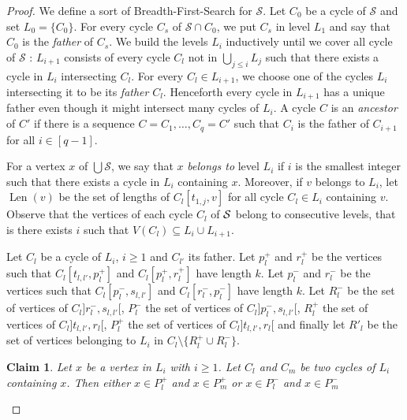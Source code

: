 \documentclass[utf8,10pt]{article}
\theoremstyle{plain}
\newtheorem{claim}{Claim}[theorem]
\theoremstyle{definition}
\theoremstyle{remark}
\DeclareMathOperator{\Len}{Len}
\begin{document}
\begin{proof}
We define a sort of Breadth-First-Search for $\mathcal{S}$.
Let $C_0$ be a cycle of $\mathcal{S}$ and set $L_0 = \{C_0\}$. For every cycle $C_s$ of $\mathcal{S}\cap C_0$, we put $C_s$ in level $L_1$ and say that $C_0$ is the \textit{father} of $C_s$. We build  the levels $L_i$ inductively
until we cover all cycle of $\mathcal{S}$ : $L_{i+1}$ consists of every cycle $C_l$ not in $\bigcup_{j \leq i} L_j$ such that 
there exists a cycle in $L_i$ intersecting $C_l$.  For every $C_l\in L_{i+1}$, we choose one of the cycles $L_{i}$ intersecting it to be its {\it  father}  $C_l$. Henceforth every cycle in $L_{i+1}$ has a unique  father even though it might intersect many cycles of $L_i$.
A cycle $C$ is an {\it ancestor} of $C'$ if there is a sequence $C=C_1, \dots , C_q=C'$ such that $C_i$ is the father of $C_{i+1}$ for all $i\in [q-1]$.

For a vertex $x$ of $\bigcup \mathcal{S}$, we say that $x$ \textit{belongs to} level $L_i$ if
$i$ is the smallest integer such that there exists a cycle in $L_i$ containing $x$. Moreover, if $v$ belongs to $L_i$, let $\Len(v)$ be the set of lengths of $C_l[t_{1,j},v]$ for all cycle $C_l \in  L_i$ containing $v$.
Observe that the vertices of each cycle $C_l$ of ${\cal S}$ belong to consecutive levels, that is there exists $i$ such that $V(C_l)\subseteq L_i\cup L_{i+1}$.




Let $C_l$ be a cycle of $L_i$, $i \geq 1$ and $C_{l'}$ its father. 
Let $p^+_l$ and $r^+_l$ be the vertices such that $C_l[t_{l,l'}, p^+_l]$ and $C_l[p^+_l,r^+_l]$  have length $k$. 
Let $p^-_l$ and $r^-_l$ be the vertices such that $C_l[p^-_l,s_{l,l'}]$ and $C_l[r^-_l,p^-_l]$ have length $k$.
Let $R^-_l$ be the set of vertices of $C_l]r^-_l, s_{l,l'}[$, $P^-_l$ the set of vertices of $C_l]p^-_l, s_{l,l'}[$,
$R^+_l$ the set of vertices of $C_l ]t_{l,l'}, r_l[$, $P^+_l$ the set of vertices of $C_l ]t_{l,l'}, r_l[$ and finally let 
$R'_l$ be the set of vertices belonging to $L_i$ in $C_l \setminus \{ R^+_l \cup R^-_l \}$. 



\begin{claim}\label{claim:Rpos}
Let $x$ be a vertex in $L_i$ with $i\geq 1$. Let $C_l$ and $C_m$ be two cycles of $L_i$ containing $x$.
Then either $x \in P^+_l$ and  $x \in  P^+_m$ or $x \in P^-_l$ and  $x \in  P^-_m$
\end{claim}


\end{proof}
\end{document}
